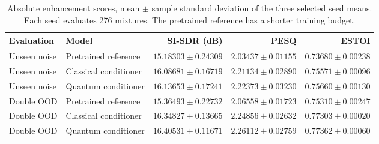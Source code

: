 \documentclass[10pt,a4paper]{article}
\begin{document}

\begin{table}[H]
\centering\small
\caption{Absolute enhancement scores, mean $\pm$ sample standard deviation of the three selected seed means. Each seed evaluates 276 mixtures. The pretrained reference has a shorter training budget.}
\label{tab:absolute}
\begin{tabular}{llrrr}
\toprule
Evaluation & Model & SI-SDR (dB) & PESQ & ESTOI\\
\midrule
Unseen noise & Pretrained reference & $15.18303 \pm 0.24309$ & $2.03437 \pm 0.01155$ & $0.73680 \pm 0.00238$ \\
Unseen noise & Classical conditioner & $16.08681 \pm 0.16719$ & $2.21134 \pm 0.02890$ & $0.75571 \pm 0.00096$ \\
Unseen noise & Quantum conditioner & $16.13653 \pm 0.17241$ & $2.22373 \pm 0.03230$ & $0.75660 \pm 0.00130$ \\
\midrule
Double OOD & Pretrained reference & $15.36493 \pm 0.22732$ & $2.06558 \pm 0.01723$ & $0.75310 \pm 0.00247$ \\
Double OOD & Classical conditioner & $16.34827 \pm 0.13665$ & $2.24856 \pm 0.02632$ & $0.77303 \pm 0.00020$ \\
Double OOD & Quantum conditioner & $16.40531 \pm 0.11671$ & $2.26112 \pm 0.02759$ & $0.77362 \pm 0.00060$ \\
\bottomrule
\end{tabular}
\end{table}
\end{document}
